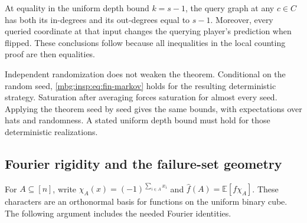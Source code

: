 \documentclass[11pt,letterpaper]{article}
\theoremstyle{definition}
\newcommand{\E}{\mathbb E}
\begin{document}
At equality in the uniform depth bound $k=s-1$, the query graph at any
$c\in C$ has both its in-degrees and its out-degrees equal to $s-1$.
Moreover, every queried coordinate at that input changes the querying
player's prediction when flipped.  These conclusions follow because all
inequalities in the local counting proof are then equalities.

Independent randomization does not weaken the theorem.  Conditional on
the random seed, \eqref{mbg:insp:eq:fin-markov} holds for the resulting deterministic
strategy.  Saturation after averaging forces saturation for almost every
seed.  Applying the theorem seed by seed gives the same bounds, with
expectations over hats and randomness.  A stated uniform depth bound must
hold for those deterministic realizations.

\subsection{Fourier rigidity and the failure-set geometry}

For $A\subseteq[n]$, write
$\chi_A(x)=(-1)^{\sum_{i\in A}x_i}$ and
$\widehat f(A)=\E[f\chi_A]$.  These characters are an orthonormal basis
for functions on the uniform binary cube.  The following argument
includes the needed Fourier identities.
\end{document}
